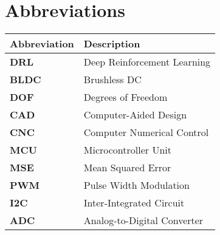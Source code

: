 \section*{Abbreviations}

\begin{longtable}[l]{p{} p{}}
    \textbf{Abbreviation} & \textbf{Description} \\
    \hline
    
    \textbf{DRL} & Deep Reinforcement Learning \\
    \textbf{BLDC} & Brushless DC \\
    \textbf{DOF} & Degrees of Freedom \\
    \textbf{CAD} & Computer-Aided Design \\
    \textbf{CNC} & Computer Numerical Control \\
    \textbf{MCU} & Microcontroller Unit \\
    \textbf{MSE} & Mean Squared Error \\
    \textbf{PWM} & Pulse Width Modulation \\
    \textbf{I2C} & Inter-Integrated Circuit \\
    \textbf{ADC} & Analog-to-Digital Converter \\
    \hline
\end{longtable}

\clearpage